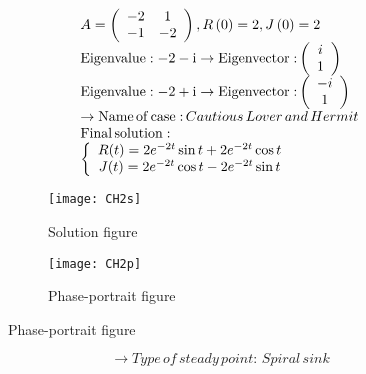 \documentclass[a4paper]{article}
\begin{document}
\[\begin{array}{l}
A = \left( {\begin{array}{*{20}{c}}
{ - 2}&1\\
{ - 1}&{ - 2}
\end{array}} \right),R\left( 0 \right) = 2,J\left( 0 \right) = 2\\
{\rm{Eigenvalue: - 2 - i}} \to {\rm{Eigenvector:}}\left( {\begin{array}{*{20}{c}}
i\\
1
\end{array}} \right)\\
{\rm{Eigenvalue: - 2 + i}} \to {\rm{Eigenvector:}}\left( {\begin{array}{*{20}{c}}
{ - i}\\
1
\end{array}} \right)\\
 \to {\rm{Name}}\,{\rm{of}}\,{\rm{case:}}\,Cautious\,Lover\,and\,Hermit\\
{\rm{Final}}\,{\rm{solution:}}\\
\left\{ {\begin{array}{*{20}{c}}
{R(t) = 2{e^{ - 2t}}\sin t + 2{e^{ - 2t}}\cos t}\\
{J(t) = 2{e^{ - 2t}}\cos t - 2{e^{ - 2t}}\sin t}
\end{array}} \right.
\end{array}\]
\begin{figure}[H]
\centering
\begin{subfigure}{.5\textwidth}
  \centering
  \texttt{[image: CH2s]}
  \caption*{Solution figure}
\end{subfigure}%
\begin{subfigure}{.5\textwidth}
  \centering
  \texttt{[image: CH2p]}
  \caption*{Phase-portrait figure}
\end{subfigure}
\end{figure}
\[  \to  Type\,of\,steady\,point:\,Spiral\,sink\]
\end{document}
